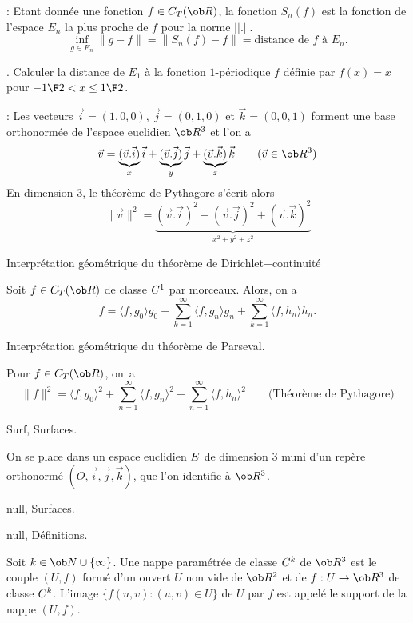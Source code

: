 \Remarque : Etant donnée une fonction $f\in\sc C_T(\ob R)$, 
la fonction $S_n(f)$ est la fonction de l'espace $E_n$ la plus proche de $f$ pour la norme $||.||$. 
$$
\inf_{g\in E_n} \|g-f\|=\|S_n(f)-f\|=\mbox{distance de $f$ à $E_n$}. 
$$

\Exemple. Calculer la distance de $E_1$ à la fonction $1$-périodique $f$ 
définie par $f(x)=x$ pour $-{1\F2}<x\le{1\F2}$. 
\bigskip

\Rappel : Les vecteurs $\vec i=(1,0,0)$, $\vec j=(0,1,0)$ et $\vec k=(0,0,1)$ 
forment une base orthonormée de l'espace euclidien $\ob R^3$ et l'on a 
$$
\vec v=\underbrace{(\vec v.\vec i)}_{x}\vec i+\underbrace{(\vec v.\vec j)}_{y}\vec j
+\underbrace{(\vec v.\vec k)}_{z}\vec k\qquad(\vec v\in\ob R^3)
$$
En dimension $3$, le théorème de Pythagore s'écrit alors
$$
\|\vec v\|^2=\underbrace{(\vec v.\vec i)^2+(\vec v.\vec j)^2+(\vec v.\vec k)^2}_{x^2+y^2+z^2}
$$ 


\Concept Interprétation géométrique du théorème de Dirichlet+continuité
 
Soit $f\in\sc C_T(\ob R)$ de classe $\sc C^1$ par morceaux. Alors, on a 
$$
f=\langle f,g_0\rangle g_0+\sum_{k=1}^\infty\langle f,g_n\rangle g_n
+\sum_{k=1}^\infty\langle f,h_n\rangle h_n.
$$ 


\Concept Interprétation géométrique du théorème de Parseval. 

Pour $f\in\sc C_T(\ob R)$, on~a 
$$
\|f\|^2=\langle f,g_0\rangle^2+\sum_{n=1}^\infty\langle f,g_n\rangle^2
+\sum_{n=1}^\infty\langle f,h_n\rangle^2\qquad \mbox{(Théorème de Pythagore)}
$$









%

\Chapter Surf, Surfaces.



On se place dans un espace euclidien $\sc E$ de dimension $3$ 
muni d'un repère orthonormé $(O,\vec i,\vec j,\vec k)$, que l'on identifie à $\ob R^3$. 
\bigskip

\Section null, Surfaces.

\Subsection null, Définitions.

\Definition [] Soit $k\in\ob N\cup\{\infty\}$. Une nappe paramétrée de classe $\sc C^k$ de $\ob R^3$ 
est le couple $(U,f)$ formé d'un ouvert $U$ non vide de $\ob R^2$ 
et de $f:U\to\ob R^3$ de classe $\sc C^k$. \smallskip\noindent
L'image $\{f(u,v):(u,v)\in U\}$ de $U$ par $f$ est appelé le support de la nappe $(U,f)$. 

